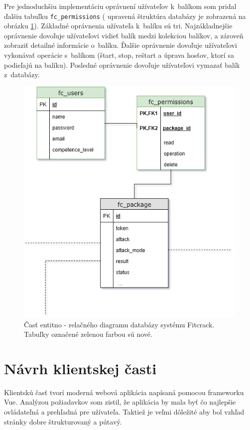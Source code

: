 \documentclass[slovak,cprint]{fitthesis} %
\begin{document}
Pre jednoduchšiu implementáciu oprávnení užívateľov k~balíkom som pridal ďalšiu tabuľku \texttt{fc\_permissions} ( upravená štruktúra databázy je zobrazená na obrázku \ref{fig:db}). Základné oprávnenia užívateľa k~balíku sú tri. Najzákladnejšie oprávnenie dovoľuje užívateľovi vidieť balík medzi kolekciou balíkov, a zároveň zobraziť detailné informácie o~balíku. Ďalšie oprávnenie dovoľuje užívateľovi vykonávať operácie s~balíkom (štart, stop, reštart a úprava hosťov, ktorí sa podieľajú na balíku). Posledné oprávnenie dovoľuje užívateľovi vymazať balík z~databázy.

\begin{figure}[h]
    \centering
    \label{fig:db}
    \includegraphics[scale=0.6]{obrazky/users.png}
    \caption{Časť entitno - relačného diagramu databázy systému Fitcrack. Tabuľky označené zelenou farbou sú nové.}
\end{figure}


\section{Návrh klientskej časti}\label{navrhKlient}
Klientskú časť tvorí moderná webová aplikácia napísaná pomocou frameworku Vue. Analýzou požiadavkov som zistil, že aplikácia by mala byť čo najlepšie ovládateľná a prehľadná pre užívateľa. Taktiež je veľmi dôležité aby bol vzhľad stránky dobre štrukturovaný a pútavý.
\end{document}
